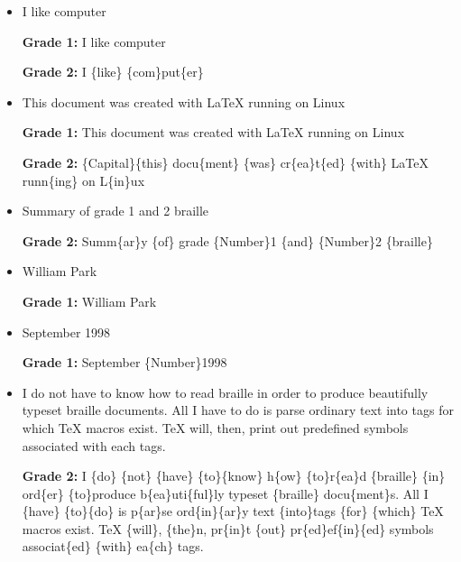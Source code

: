 \documentclass[draft]{article}
\begin{document}
\sloppy
\begin{itemize}
\item I like computer 

    {\bf Grade 1:} I  like  computer \\
    
    {\bf Grade 2:} I \{like\} \{com\}put\{er\} \\

\item This document was created with LaTeX running on Linux

    {\bf Grade 1:}
    This document was created with LaTeX running on Linux 
    \\

    {\bf Grade 2:}
    \{Capital\}\{this\} docu\{ment\} \{was\} cr\{ea\}t\{ed\} \{with\}
    LaTeX runn\{ing\} on L\{in\}ux 
    \\

\item Summary of grade 1 and 2 braille

    {\bf Grade 2:}
    Summ\{ar\}y \{of\} grade \{Number\}1 \{and\} \{Number\}2 \{braille\} 
    \\

\item William Park

    {\bf Grade 1:} William Park \\

\item September 1998

    {\bf Grade 1:} September \{Number\}1998 \\

\item I do not have to know how to read braille in order to produce
    beautifully typeset braille documents.  All I have to do is parse
    ordinary text into tags for which TeX macros exist.  TeX will,
    then, print out predefined symbols associated with each tags.
    
    {\bf Grade 2:}
    I \{do\} \{not\} \{have\} \{to\}\{know\} h\{ow\} \{to\}r\{ea\}d
    \{braille\} \{in\} ord\{er\} \{to\}produce b\{ea\}uti\{ful\}ly
    typeset \{braille\} docu\{ment\}s.  All I \{have\} \{to\}\{do\} is
    p\{ar\}se ord\{in\}\{ar\}y text \{into\}tags \{for\} \{which\} TeX
    macros exist.  TeX \{will\}, \{the\}n, pr\{in\}t \{out\}
    pr\{ed\}ef\{in\}\{ed\} symbols associat\{ed\} \{with\} ea\{ch\}
    tags.
    \\

\end{itemize}
\end{document}

